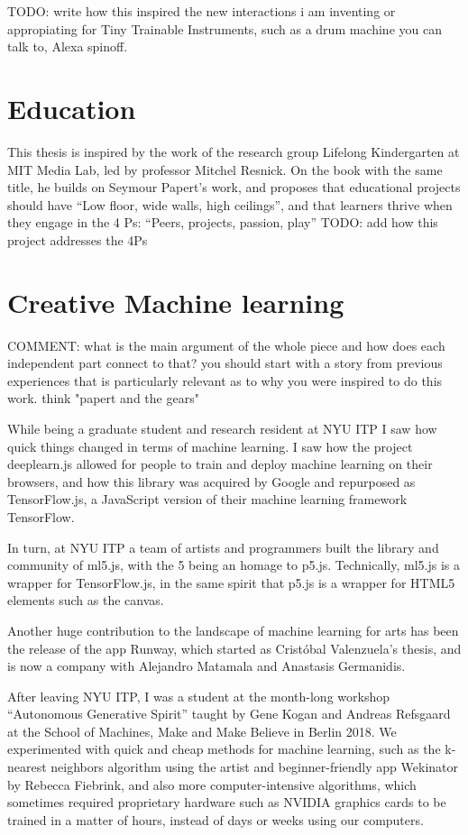 TODO: write how this inspired the new interactions i am inventing or appropiating for Tiny Trainable Instruments, such as a drum machine you can talk to, Alexa spinoff.

\section{Education}

This thesis is inspired by the work of the research group Lifelong Kindergarten at MIT Media Lab, led by professor Mitchel Resnick. On the book with the same title, he builds on Seymour Papert’s work, and proposes that educational projects should have “Low floor, wide walls, high ceilings”, and that learners thrive when they engage in the 4 Ps: “Peers, projects, passion, play”
TODO: add how this project addresses the 4Ps

\section{Creative Machine learning}

COMMENT: what is the main argument of the whole piece and how does each independent part connect to that? you should start with a story from previous experiences that is particularly relevant as to why you were inspired to do this work. think "papert and the gears"

While being a graduate student and research resident at NYU ITP I saw how quick things changed in terms of machine learning. I saw how the project deeplearn.js allowed for people to train and deploy machine learning on their browsers, and how this library was acquired by Google and repurposed as TensorFlow.js, a JavaScript version of their machine learning framework TensorFlow.

In turn, at NYU ITP a team of artists and programmers built the library and community of ml5.js, with the 5 being an homage to p5.js. Technically, ml5.js is a wrapper for TensorFlow.js, in the same spirit that p5.js is a wrapper for HTML5 elements such as the canvas.

Another huge contribution to the landscape of machine learning for arts has been the release of the app Runway, which started as Cristóbal Valenzuela’s thesis, and is now a company with Alejandro Matamala and Anastasis Germanidis.

After leaving NYU ITP, I was a student at the month-long workshop “Autonomous Generative Spirit” taught by Gene Kogan and Andreas Refsgaard at the School of Machines, Make and Make Believe in Berlin 2018. We experimented with quick and cheap methods for machine learning, such as the k-nearest neighbors algorithm using the artist and beginner-friendly app Wekinator by Rebecca Fiebrink, and also more computer-intensive algorithms, which sometimes required proprietary hardware such as NVIDIA graphics cards to be trained in a matter of hours, instead of days or weeks using our computers.

